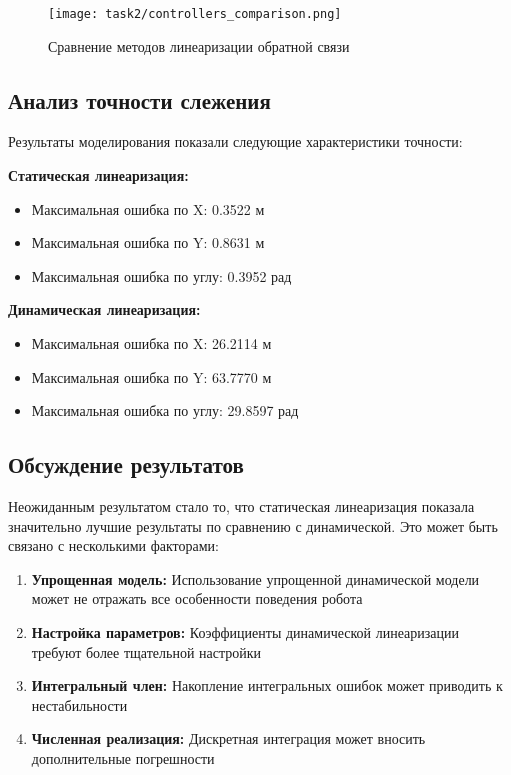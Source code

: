 \begin{figure}[H]
\centering
\texttt{[image: task2/controllers\_comparison.png]}
\caption{Сравнение методов линеаризации обратной связи}
\label{fig:controllers_comparison}
\end{figure}

\subsection{Анализ точности слежения}

Результаты моделирования показали следующие характеристики точности:

\textbf{Статическая линеаризация:}
\begin{itemize}
\item Максимальная ошибка по X: 0.3522 м
\item Максимальная ошибка по Y: 0.8631 м
\item Максимальная ошибка по углу: 0.3952 рад
\end{itemize}

\textbf{Динамическая линеаризация:}
\begin{itemize}
\item Максимальная ошибка по X: 26.2114 м
\item Максимальная ошибка по Y: 63.7770 м
\item Максимальная ошибка по углу: 29.8597 рад
\end{itemize}

\subsection{Обсуждение результатов}

Неожиданным результатом стало то, что статическая линеаризация показала значительно лучшие результаты по сравнению с динамической. Это может быть связано с несколькими факторами:

\begin{enumerate}
\item \textbf{Упрощенная модель:} Использование упрощенной динамической модели может не отражать все особенности поведения робота
\item \textbf{Настройка параметров:} Коэффициенты динамической линеаризации требуют более тщательной настройки
\item \textbf{Интегральный член:} Накопление интегральных ошибок может приводить к нестабильности
\item \textbf{Численная реализация:} Дискретная интеграция может вносить дополнительные погрешности
\end{enumerate}

